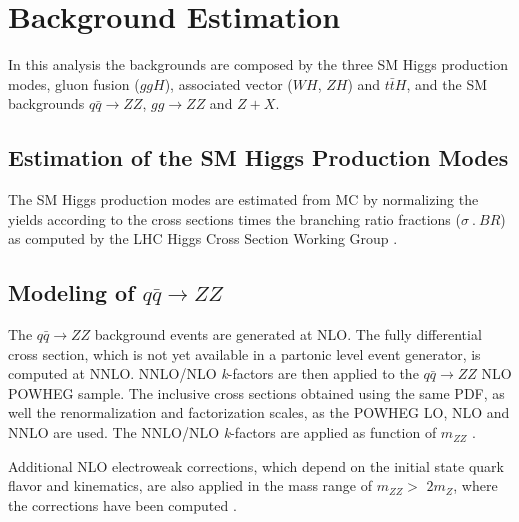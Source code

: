 \chapter{Background Estimation}
\label{sec:bkg_estimation}
In this analysis the backgrounds are composed by the three SM Higgs production modes, gluon fusion ($ggH$), associated vector ($WH$, $ZH$) and $t\bar{t}H$, and the SM backgrounds $q\bar{q} \rightarrow ZZ$, $gg \rightarrow ZZ$ and $Z+X$.

\section{Estimation of the SM Higgs Production Modes}
\label{sec:smhiggs_other_modes}
The SM Higgs production modes are estimated from MC by normalizing the yields according to the cross sections times the branching ratio fractions ($\sigma~.~BR$) as computed by the LHC Higgs Cross Section Working Group \cite{bib:CMS-AN-16-328}.

\section{Modeling of $q\bar{q} \rightarrow ZZ$}
\label{sec:qqzz_modeling}
The $q\bar{q} \rightarrow ZZ$ background events are generated at NLO. The fully differential cross section, which is not yet available in a partonic level event generator, is computed at NNLO. NNLO/NLO \textit{k}-factors are then applied to the $q\bar{q} \rightarrow ZZ$ NLO POWHEG sample. The inclusive cross sections obtained using the same PDF, as well the renormalization and factorization scales, as the POWHEG LO, NLO and NNLO are used. The NNLO/NLO \textit{k}-factors are applied as function of $m_{ZZ}$ \cite{bib:CMS-AN-16-328, bib:CMS-AN-16-442}.

Additional NLO electroweak corrections, which depend on the initial state quark flavor and kinematics, are also applied in the mass range of $m_{ZZ} >$ $2m_{Z}$, where the corrections have been computed \cite{bib:CMS-AN-16-442}.

